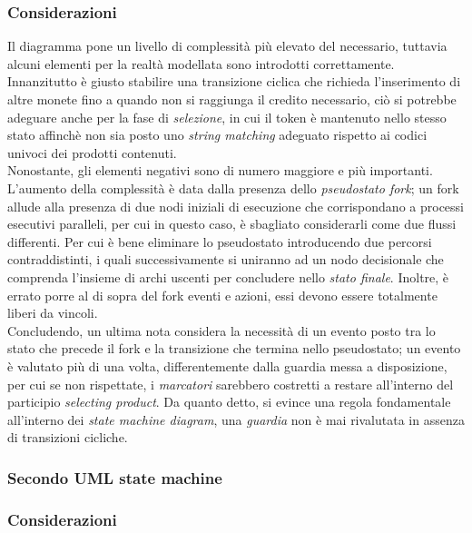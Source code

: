\documentclass{article}
\begin{document}
\subsubsection*{Considerazioni}
Il diagramma pone un livello di complessità più elevato del necessario, tuttavia alcuni elementi per la realtà modellata sono introdotti correttamente. Innanzitutto è giusto stabilire una transizione ciclica che richieda l'inserimento di altre monete fino a quando non si raggiunga il credito necessario, ciò si potrebbe adeguare anche per la fase di \textit{selezione}, in cui il token è mantenuto nello stesso stato affinchè non sia posto uno \textit{string matching} adeguato rispetto ai codici univoci dei prodotti contenuti.\vspace*{14pt}\\
Nonostante, gli elementi negativi sono di numero maggiore e più importanti. L'aumento della complessità è data dalla presenza dello \textit{pseudostato fork}; un fork allude alla presenza di due nodi iniziali di esecuzione che corrispondano a processi esecutivi paralleli, per cui in questo caso, è sbagliato considerarli come due flussi differenti. Per cui è bene eliminare lo pseudostato introducendo due percorsi contraddistinti, i quali successivamente si uniranno ad un nodo decisionale che comprenda l'insieme di archi uscenti per concludere nello \textit{stato finale}. Inoltre, è errato porre al di sopra del fork eventi e azioni, essi devono essere totalmente liberi da vincoli.\vspace*{14pt}\\
Concludendo, un ultima nota considera la necessità di un evento posto tra lo stato che precede il fork e la transizione che termina nello pseudostato; un evento è valutato più di una volta, differentemente dalla guardia messa a disposizione, per cui se non rispettate, i \textit{marcatori} sarebbero costretti a restare all'interno del participio \textit{selecting product}. Da quanto detto, si evince una regola fondamentale all'interno dei \textit{state machine diagram}, una \textit{guardia} non è mai rivalutata in assenza di transizioni cicliche. 
\subsubsection*{Secondo UML state machine}
\large

\subsubsection*{Considerazioni}
\large
\end{document}
